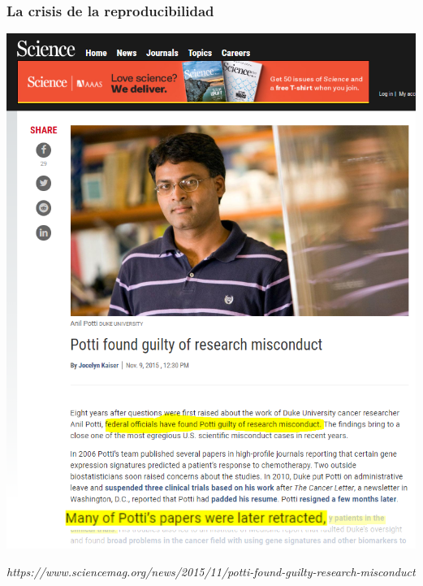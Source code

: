 \documentclass[9pt]{beamer}
\begin{document}
\begin{frame}
  \frametitle{La crisis de la reproducibilidad}
  \begin{center}
    \includegraphics[height=0.85\textheight]{images/potti_portada_4}
  \end{center}
  \hfill\begin{minipage}[h]{0.8\linewidth}
    {\tiny \textit{https://www.sciencemag.org/news/2015/11/potti-found-guilty-research-misconduct}}
  \end{minipage}
\end{frame}
\end{document}
